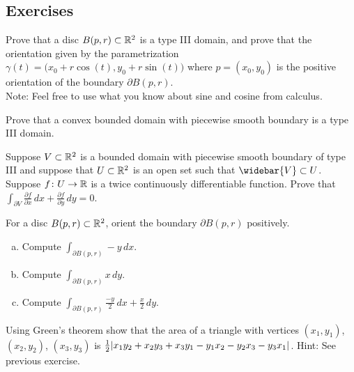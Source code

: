 \subsection{Exercises}

\begin{exercise} \label{green:balltype3orient}
Prove that a disc $B(p,r) \subset {\mathbb{R}}^2$ is a type III domain, and prove that
the orientation given by the parametrization $\gamma(t) =
\bigl(x_0+r\cos(t),y_0+r\sin(t)\bigr)$ where $p = (x_0,y_0)$ is the positive
orientation of the boundary $\partial B(p,r)$.
\\
Note: Feel free to use what you know about sine and cosine from calculus.
\end{exercise}

\begin{exercise}
Prove that a convex bounded domain with piecewise smooth boundary
is a type III domain.
\end{exercise}

\begin{exercise}
Suppose $V \subset {\mathbb{R}}^2$ is a bounded domain with piecewise smooth boundary
of type III and suppose that $U \subset {\mathbb{R}}^2$ is an open set such that
$\widebar{V} \subset U$.  Suppose $f \colon U \to {\mathbb{R}}$ is a twice
continuously differentiable function.  Prove that
$\int_{\partial V}
\frac{\partial f}{\partial x} \, dx + 
\frac{\partial f}{\partial y} \, dy = 0$.
\end{exercise}

\begin{samepage}
\begin{exercise}
For a disc $B(p,r) \subset {\mathbb{R}}^2$, orient the boundary $\partial B(p,r)$
positively.
\begin{enumerate}[a)]
\item
Compute $\displaystyle \int_{\partial B(p,r)} -y \, dx$.
\item
Compute $\displaystyle \int_{\partial B(p,r)} x \, dy$.
\item
Compute $\displaystyle \int_{\partial B(p,r)} \frac{-y}{2} \, dx +
\frac{x}{2} \, dy$.
\end{enumerate}
\end{exercise}
\end{samepage}

\begin{exercise}
Using Green's theorem show that the area of a triangle with
vertices
$(x_1,y_1)$,
$(x_2,y_2)$,
$(x_3,y_3)$ is
$\frac{1}{2}\lvert {x_1y_2 + x_2 y_3 + x_3 y_1 - y_1x_2 - y_2x_3 - y_3x_1} \rvert$.
Hint: See previous exercise.
\end{exercise}


